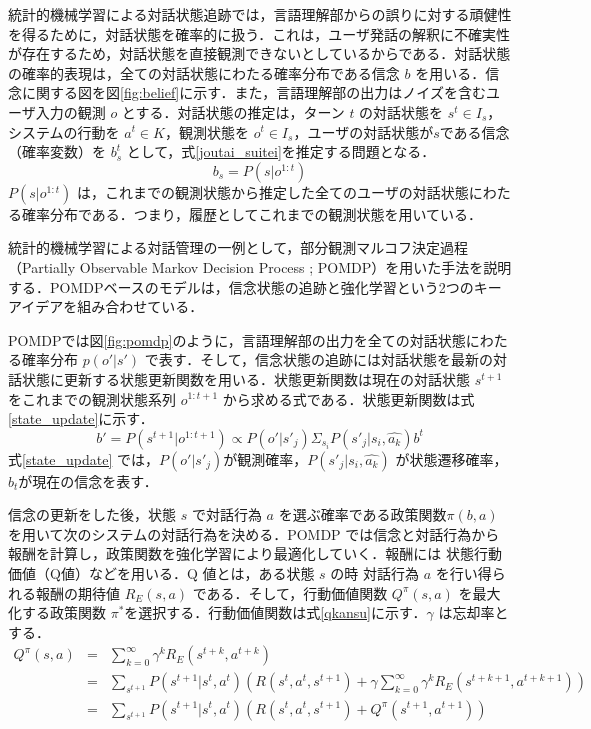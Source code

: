 統計的機械学習による対話状態追跡では，言語理解部からの誤りに対する頑健性を得るために，対話状態を確率的に扱う．これは，ユーザ発話の解釈に不確実性が存在するため，対話状態を直接観測できないとしているからである．対話状態の確率的表現は，全ての対話状態にわたる確率分布である信念 $b$ を用いる．信念に関する図を図\ref{fig:belief}に示す．また，言語理解部の出力はノイズを含むユーザ入力の観測 $o$ とする．対話状態の推定は，ターン $t$ の対話状態を $s^t \in I_s$，
システムの行動を $a^t \in K$，観測状態を $o^t \in I_s$，ユーザの対話状態が$s$である信念（確率変数）を $b^t_s$ として，式\ref{joutai_suitei}を推定する問題となる．
\begin{equation}
  \label{joutai_suitei}
  b_s = P(s|o^{1:t})
\end{equation}
$P(s|o^{1:t})$ は，これまでの観測状態から推定した全てのユーザの対話状態にわたる確率分布である．つまり，履歴としてこれまでの観測状態を用いている．
\par
統計的機械学習による対話管理の一例として，部分観測マルコフ決定過程（Partially Observable Markov Decision Process ; POMDP）\cite{pomdp,pomdp_review}を用いた手法を説明する．POMDPベースのモデルは，信念状態の追跡と強化学習という2つのキーアイデアを組み合わせている．\cite{pomdp_review}
\par
POMDPでは図\ref{fig:pomdp}のように，言語理解部の出力を全ての対話状態にわたる確率分布 $p(o'|s')$ で表す．そして，信念状態の追跡には対話状態を最新の対話状態に更新する状態更新関数を用いる．状態更新関数は現在の対話状態 $s^{t+1}$ をこれまでの観測状態系列 $o^{1:t+1}$ から求める式である．状態更新関数は式\ref{state_update}に示す．
\begin{equation}
  \label{state_update}
  b' = P\left(s^{t+1}|o^{1:t+1}\right) \propto P\left(o'|s'_{j}\right) \Sigma_{s_i} P\left(s'_{j}|s_i, \widehat{a_k}\right)b^t
\end{equation}
式\ref{state_update} では，$P(o'|s'_j)$が観測確率，$P(s'_j|s_i,\widehat{a_k})$ が状態遷移確率，$b_t$が現在の信念を表す．
\par
信念の更新をした後，状態 $s$ で対話行為 $a$ を選ぶ確率である政策関数$\pi (b,a)$を用いて次のシステムの対話行為を決める．POMDP では信念と対話行為から報酬を計算し，政策関数を強化学習により最適化していく．報酬には 状態行動価値（Q値）などを用いる．Q 値とは，ある状態 $s$ の時 対話行為 $a$ を行い得られる報酬の期待値 $R_E(s,a)$ である．そして，行動価値関数 $Q^{\pi}(s,a)$ を最大化する政策関数 $\pi^{*}$を選択する．行動価値関数は式\ref{qkansu}に示す．$\gamma$ は忘却率とする．
\begin{eqnarray}
  Q^{\pi}(s,a) & = & \sum^{\infty}_{k=0} \gamma^k R_E\left(s^{t+k},a^{t+k}\right) \\
  & = & \sum_{s^{t+1}}P\left(s^{t+1}|s^t,a^t\right)\left(R\left(s^t,a^t,s^{t+1}\right) + \gamma\sum^{\infty}_{k=0} \gamma^k R_E\left(s^{t+k+1},a^{t+k+1}\right)\right) \\
  \label{qkansu}
  & = & \sum_{s^{t+1}}P\left(s^{t+1}|s^t,a^t \right) \left(R\left(s^t,a^t,s^{t+1}\right) + Q^{\pi}\left(s^{t+1},a^{t+1}\right)\right)
\end{eqnarray}
